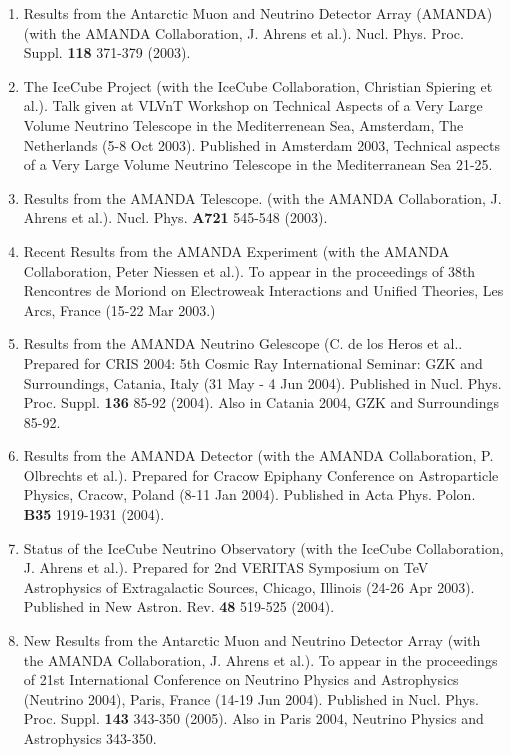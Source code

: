 \begin{enumerate}
\item Results from the Antarctic Muon and Neutrino Detector Array (AMANDA) (with the AMANDA Collaboration, J. Ahrens et al.).  Nucl. Phys. Proc. Suppl. {\bf 118} 371-379 (2003).

\item The IceCube Project (with the IceCube Collaboration, Christian Spiering et al.).  Talk given at VLVnT Workshop on Technical Aspects of a Very Large Volume Neutrino Telescope in the Mediterrenean Sea, Amsterdam, The Netherlands (5-8 Oct 2003). Published in Amsterdam 2003, Technical aspects of a Very Large Volume Neutrino Telescope in the Mediterranean Sea 21-25.

\item Results from the AMANDA Telescope. (with the AMANDA Collaboration, J. Ahrens et al.).  Nucl. Phys. {\bf A721} 545-548 (2003).

\item Recent Results from the AMANDA Experiment (with the AMANDA Collaboration, Peter Niessen et al.).  To appear in the proceedings of 38th Rencontres de Moriond on Electroweak Interactions and Unified Theories, Les Arcs, France (15-22 Mar 2003.)

\item Results from the AMANDA Neutrino Gelescope (C. de los Heros et al..  Prepared for CRIS 2004: 5th Cosmic Ray International Seminar: GZK and Surroundings, Catania, Italy (31 May - 4 Jun 2004).  Published in Nucl. Phys. Proc. Suppl. {\bf 136} 85-92 (2004). Also in Catania 2004, GZK and Surroundings 85-92.

\item Results from the AMANDA Detector (with the AMANDA Collaboration, P. Olbrechts et al.).  Prepared for Cracow Epiphany Conference on Astroparticle Physics, Cracow, Poland (8-11 Jan 2004).  Published in Acta Phys. Polon. {\bf B35} 1919-1931 (2004).

\item Status of the IceCube Neutrino Observatory (with the IceCube Collaboration, J. Ahrens et al.).  Prepared for 2nd VERITAS Symposium on TeV Astrophysics of Extragalactic Sources, Chicago, Illinois (24-26 Apr 2003).  Published in New Astron. Rev. {\bf 48} 519-525 (2004).

\item New Results from the Antarctic Muon and Neutrino Detector Array (with the AMANDA Collaboration, J. Ahrens et al.).  To appear in the proceedings of 21st International Conference on Neutrino Physics and Astrophysics (Neutrino 2004), Paris, France (14-19 Jun 2004). Published in Nucl. Phys. Proc. Suppl. {\bf 143} 343-350 (2005). Also in Paris 2004, Neutrino Physics and Astrophysics 343-350.


\end{enumerate}
